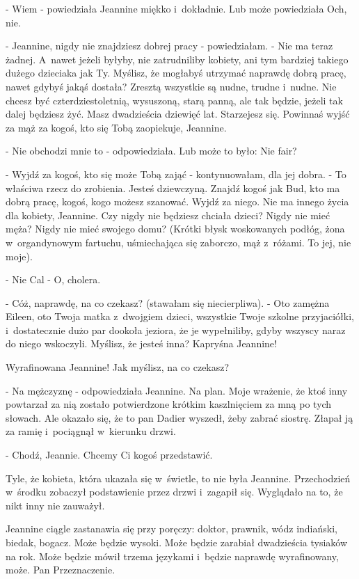 \documentclass[oneside,polish,12pt,sfheadings]{mwbk}
\begin{document}
- Wiem - powiedziała Jeannine miękko i~dokładnie. Lub może powiedziała
Och, nie.

- Jeannine, nigdy nie znajdziesz dobrej pracy - powiedziałam. - Nie
ma teraz żadnej. A~nawet jeżeli byłyby, nie zatrudniliby kobiety,
ani tym bardziej takiego dużego dzieciaka jak Ty. Myślisz, że mogłabyś
utrzymać naprawdę dobrą pracę, nawet gdybyś jakąś dostała? Zresztą
wszystkie są nudne, trudne i~nudne. Nie chcesz być czterdziestoletnią,
wysuszoną, starą panną, ale tak będzie, jeżeli tak dalej będziesz
żyć. Masz dwadzieścia dziewięć lat. Starzejesz się. Powinnaś wyjść
za mąż za kogoś, kto się Tobą zaopiekuje, Jeannine.

- Nie obchodzi mnie to - odpowiedziała. Lub może to było: Nie fair?

- Wyjdź za kogoś, kto się może Tobą zająć - kontynuowałam, dla jej
dobra. - To właściwa rzecz do zrobienia. Jesteś dziewczyną. Znajdź
kogoś jak Bud, kto ma dobrą pracę, kogoś, kogo możesz szanować. Wyjdź
za niego. Nie ma innego życia dla kobiety, Jeannine. Czy nigdy nie
będziesz chciała dzieci? Nigdy nie mieć męża? Nigdy nie mieć swojego
domu? (Krótki błysk woskowanych podłóg, żona w~organdynowym fartuchu,
uśmiechająca się zaborczo, mąż z~różami. To jej, nie moje).

- Nie Cal - O, cholera.

- Cóż, naprawdę, na co czekasz? (stawałam się niecierpliwa). - Oto
zamężna Eileen, oto Twoja matka z~dwojgiem dzieci, wszystkie Twoje
szkolne przyjaciółki, i~dostatecznie dużo par dookoła jeziora, że
je wypełniliby, gdyby wszyscy naraz do niego wskoczyli. Myślisz, że
jesteś inna? Kapryśna Jeannine!

Wyrafinowana Jeannine! Jak myślisz, na co czekasz?

- Na mężczyznę - odpowiedziała Jeannine. Na plan. Moje wrażenie, że
ktoś inny powtarzał za nią zostało potwierdzone krótkim kaszlnięciem
za mną po tych słowach. Ale okazało się, że to pan Dadier wyszedł,
żeby zabrać siostrę. Złapał ją za ramię i~pociągnął w~kierunku drzwi.

- Chodź, Jeannie. Chcemy Ci kogoś przedstawić.

Tyle, że kobieta, która ukazała się w~świetle, to nie była Jeannine.
Przechodzień w~środku zobaczył podstawienie przez drzwi i~zagapił
się. Wyglądało na to, że nikt inny nie zauważył.

Jeannine ciągle zastanawia się przy poręczy: doktor, prawnik, wódz
indiański, biedak, bogacz. Może będzie wysoki. Może będzie zarabiał
dwadzieścia tysiaków na rok. Może będzie mówił trzema językami i~będzie
naprawdę wyrafinowany, może. Pan Przeznaczenie.
\end{document}
